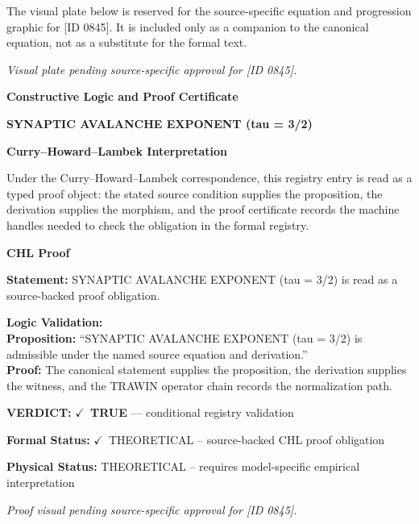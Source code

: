 \begingroup\footnotesize\sloppy
The visual plate below is reserved for the source-specific equation and progression graphic for [ID 0845]. It is included only as a companion to the canonical equation, not as a substitute for the formal text.
\par\endgroup
\begingroup\footnotesize\itshape
Visual plate pending source-specific approval for [ID 0845].
\par\endgroup

\clearpage
\begingroup\tzpsupportsetup
\noindent\textbf{\fontsize{10.8pt}{12.8pt}\selectfont [ID 0845] Constructive Logic and Proof Certificate}\par
\noindent\textbf{\fontsize{10pt}{12pt}\selectfont SYNAPTIC AVALANCHE EXPONENT (tau = 3/2)}\par
\vspace{0.45em}
\begingroup
\footnotesize
\setlength{\parskip}{0.22em}
\setlength{\parindent}{0pt}
\noindent\textbf{Curry--Howard--Lambek Interpretation}\par
Under the Curry--Howard--Lambek correspondence, this registry entry is read as a typed proof
object: the stated source condition supplies the proposition, the derivation supplies the
morphism, and the proof certificate records the machine handles needed to check the obligation
in the formal registry.

\vspace{0.45em}
\noindent\textbf{CHL Proof}\par
\textbf{Statement:} SYNAPTIC AVALANCHE EXPONENT (tau = 3/2) is read as a source-backed proof obligation.

\textbf{Logic Validation:}\\
\textbf{Proposition:} ``SYNAPTIC AVALANCHE EXPONENT (tau = 3/2) is admissible under the named source equation and derivation.''\\
\textbf{Proof:} The canonical statement supplies the proposition, the derivation supplies the witness, and the TRAWIN operator chain records the normalization path.

\textbf{VERDICT:} \ensuremath{\checkmark}\ \textbf{TRUE} --- conditional registry validation

\textbf{Formal Status:} \ensuremath{\checkmark}\ THEORETICAL -- source-backed CHL proof obligation

\textbf{Physical Status:} THEORETICAL -- requires model-specific empirical interpretation
\par\vspace{0.45em}
\par
\vfill
\begingroup\footnotesize\itshape
Proof visual pending source-specific approval for [ID 0845].
\par\endgroup
\vfill
\endgroup
\endgroup
